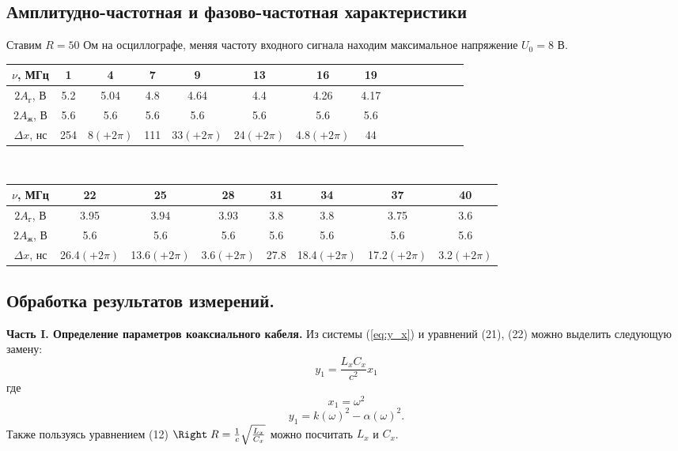 \documentclass[a4paper,12pt]{extarticle}
\begin{document}
\subsection*{Амплитудно-частотная и фазово-частотная характеристики}
Ставим $R = 50$ Ом на осциллографе, меняя частоту входного сигнала находим максимальное напряжение $U_0 = 8$ В.\\
\begin{tabular}{|c|c|c|c|c|c|c|c|c|c|c|c|c|c|c|}
\hline
$\nu$, МГц  & 1   & 4    & 7   & 9    & 13  & 16   & 19   \\ \hline
$2A_\text{г}$, В & 5.2 & 5.04 & 4.8 & 4.64 & 4.4 & 4.26 & 4.17 \\ \hline
$2A_\text{ж}$, В & 5.6 & 5.6  & 5.6 & 5.6  & 5.6 & 5.6  & 5.6  \\ \hline
$\Delta x$, нс   & 254 & 8$(+2\pi)$   & 111 & 33$(+2\pi)$  & 24$(+2\pi)$ & 4.8$(+2\pi)$ & 44   \\ \hline
\end{tabular} \\
\begin{tabular}{|c|c|c|c|c|c|c|c|}
\hline
$\nu$, МГц  & 22     & 25    & 28   & 31   & 34    & 37    & 40   \\ \hline
$2A_\text{г}$, В & 3.95  & 3.94  & 3.93 & 3.8  & 3.8   & 3.75  & 3.6  \\ \hline
$2A_\text{ж}$, В & 5.6   & 5.6   & 5.6  & 5.6  & 5.6   & 5.6   & 5.6  \\ \hline
$\Delta x$, нс  & 26.4$(+2\pi)$ & 13.6$(+2\pi)$ & 3.6$(+2\pi)$ & 27.8 & 18.4$(+2\pi)$ & 17.2$(+2\pi)$ & 3.2$(+2\pi)$ \\ \hline
\end{tabular}



\subsection*{Обработка результатов измерений.}
\textbf{Часть I. Определение параметров коаксиального кабеля.}
Из системы (\ref{eq:y_x}) и уравнений (21), (22) можно выделить следующую замену: 
\begin{equation*}
    y_1 = \frac{L_x C_x}{c^2} x_1
    \label{eq:y1_x1}
\end{equation*}
где 
$$x_1 = \omega^2$$
$$y_1 = k(\omega)^2 - \alpha(\omega)^2.$$
Также пользуясь уравнением (12) $\Right\;R = \frac{1}{c} \sqrt{\frac{L_x}{C_x}}$ можно посчитать $L_x$ и $C_x$. 
\end{document}
